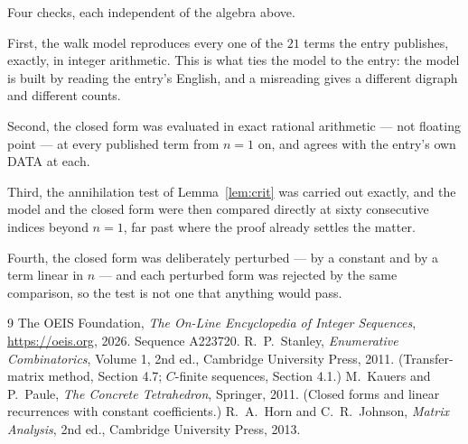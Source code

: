 \documentclass[11pt,a4paper]{article}
\theoremstyle{plain}
\theoremstyle{definition}
\begin{document}
Four checks, each independent of the algebra above.

First, the walk model reproduces every one of the $21$ terms the entry publishes,
exactly, in integer arithmetic. This is what ties the model to the entry: the model is built
by reading the entry's English, and a misreading gives a different digraph and different
counts.

Second, the closed form was evaluated in exact rational arithmetic --- not floating point ---
at every published term from $n=1$ on, and agrees with the entry's own DATA at each.

Third, the annihilation test of Lemma~\ref{lem:crit} was carried out exactly, and the model
and the closed form were then compared directly at sixty consecutive indices beyond
$n=1$, far past where the proof already settles the matter.

Fourth, the closed form was deliberately perturbed --- by a constant and by a term linear in
$n$ --- and each perturbed form was rejected by the same comparison, so the test is not one
that anything would pass.

\begin{thebibliography}{9}
 The OEIS Foundation, \emph{The On-Line Encyclopedia of Integer
Sequences}, \url{https://oeis.org}, 2026. Sequence A223720.
 R.~P.~Stanley, \emph{Enumerative Combinatorics}, Volume 1, 2nd ed.,
Cambridge University Press, 2011. (Transfer-matrix method, Section 4.7; $C$-finite sequences,
Section 4.1.)
 M.~Kauers and P.~Paule, \emph{The Concrete Tetrahedron}, Springer, 2011.
(Closed forms and linear recurrences with constant coefficients.)
 R.~A.~Horn and C.~R.~Johnson, \emph{Matrix Analysis}, 2nd ed., Cambridge
University Press, 2013.
\end{thebibliography}
\end{document}
